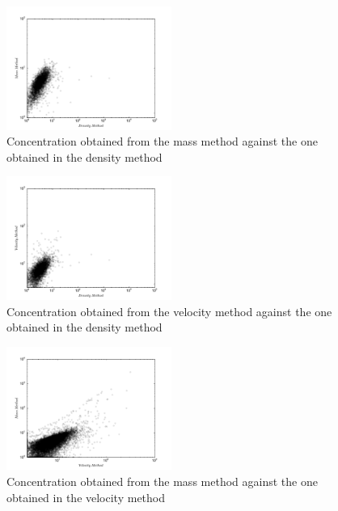 \documentclass[useAMS,usenatbib]{mn2e}
\begin{document}
\begin{figure}
\begin{center}
  \includegraphics[width=0.48\textwidth]{density-mass.pdf}
\end{center}
\caption{Concentration obtained from the mass method against the one obtained in the density method
    \label{fig:density-mass}}
\end{figure}
\begin{figure}
\begin{center}
  \includegraphics[width=0.48\textwidth]{density-velocity.pdf}
\end{center}
\caption{Concentration obtained from the velocity method against the one obtained in the density method
    \label{fig:density-velocity}}
\end{figure}
\begin{figure}
\begin{center}
  \includegraphics[width=0.48\textwidth]{velocity-mass.pdf}
\end{center}
\caption{Concentration obtained from the mass method against the one obtained in the velocity method
    \label{fig:velocity-mass}}
\end{figure}
\end{document}
